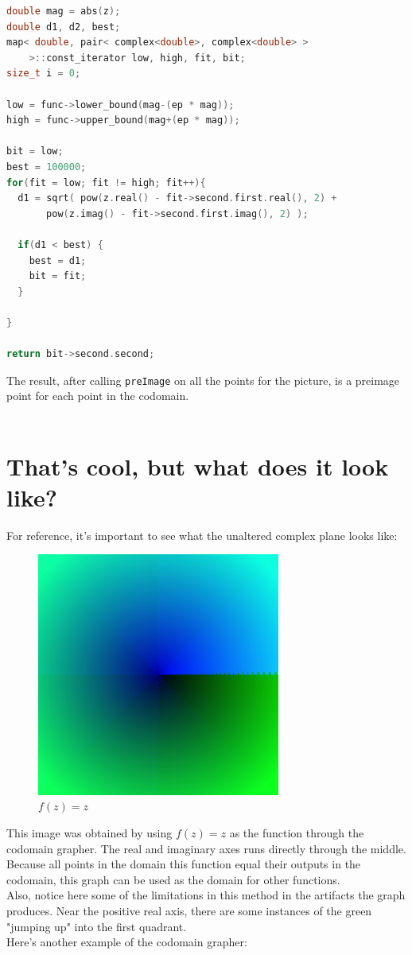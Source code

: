 \documentclass[letterpaper,12pt]{article}
\begin{document}
\begin{lstlisting}[language=c++]
double mag = abs(z);
double d1, d2, best;
map< double, pair< complex<double>, complex<double> >
    >::const_iterator low, high, fit, bit;
size_t i = 0;

low = func->lower_bound(mag-(ep * mag));
high = func->upper_bound(mag+(ep * mag));

bit = low;
best = 100000;
for(fit = low; fit != high; fit++){
  d1 = sqrt( pow(z.real() - fit->second.first.real(), 2) +
       pow(z.imag() - fit->second.first.imag(), 2) );

  if(d1 < best) {
    best = d1;
    bit = fit;
  }

}

return bit->second.second;

\end{lstlisting}

The result, after calling \verb|preImage| on all the points for the picture, is a preimage point for each point in the codomain. \\ \\

\section{That's cool, but what does it look like?}

For reference, it's important to see what the unaltered complex plane looks like:

\begin{figure}[h]
	\includegraphics[width=8cm]{f(z)=z}
	\centering
	\caption{\small$f(z) = z$}
	\centering
\end{figure}

This image was obtained by using $f(z) = z$ as the function through the codomain grapher.
The real and imaginary axes runs directly through the middle.
Because all points in the domain this function equal their outputs in the codomain, this graph can be used as the domain for other functions.
\\
Also, notice here some of the limitations in this method in the artifacts the graph produces.
Near the positive real axis, there are some instances of the green "jumping up" into the first quadrant.
\\
Here's another example of the codomain grapher:
\end{document}

